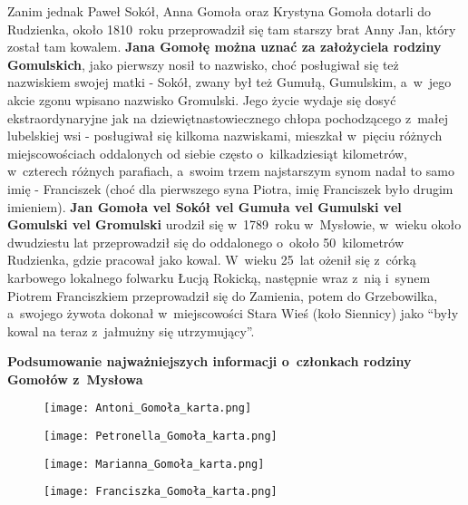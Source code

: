 Zanim jednak Paweł Sokół, Anna Gomoła oraz Krystyna Gomoła dotarli do 
Rudzienka, około 1810~roku przeprowadził się tam starszy brat Anny Jan, 
który został tam kowalem. \textbf{Jana Gomołę można uznać za założyciela 
rodziny Gomulskich}, jako pierwszy nosił to nazwisko, choć posługiwał się też 
nazwiskiem swojej matki - Sokół, zwany był też Gumułą, Gumulskim, a~w~jego 
akcie zgonu wpisano nazwisko Gromulski. Jego życie wydaje się dosyć 
ekstraordynaryjne jak na dziewiętnastowiecznego chłopa pochodzącego z~małej 
lubelskiej wsi - posługiwał się kilkoma nazwiskami, mieszkał w~pięciu
różnych miejscowościach oddalonych od siebie często o~kilkadziesiąt 
kilometrów, w~czterech różnych parafiach, a~swoim trzem najstarszym synom 
nadał to samo imię - Franciszek (choć dla pierwszego syna Piotra, imię 
Franciszek było drugim imieniem). \textbf{Jan Gomoła vel Sokół vel Gumuła vel 
Gumulski vel Gomulski vel Gromulski} urodził się w~1789~roku w~Mysłowie, 
w~wieku około dwudziestu lat przeprowadził się do oddalonego o~około 
50~kilometrów Rudzienka, gdzie pracował jako kowal. W~wieku 25~lat ożenił się 
z~córką karbowego lokalnego folwarku Łucją Rokicką, następnie wraz z~nią 
i~synem Piotrem Franciszkiem przeprowadził się do Zamienia, potem do 
Grzebowilka, a~swojego żywota dokonał w~miejscowości Stara Wieś (koło 
Siennicy) jako \enquote{były kowal na teraz z~jałmużny się utrzymujący}.

\clearpage
\textbf{\large Podsumowanie najważniejszych informacji o~członkach rodziny 
Gomołów z~Mysłowa}

\begin{figure}[!ht]
    \vspace*{0.5cm}
    \centering \texttt{[image: Antoni\_Gomoła\_karta.png]}
\end{figure}

\begin{figure}[!ht]
    \vspace*{0.5cm}
    \centering \texttt{[image: 
        Petronella\_Gomoła\_karta.png]}
\end{figure}

\begin{figure}[!ht]
    \vspace*{0.5cm}
    \centering \texttt{[image: 
        Marianna\_Gomoła\_karta.png]}
\end{figure}

\begin{figure}[!ht]
    \vspace*{0.5cm}
    \centering \texttt{[image: 
        Franciszka\_Gomoła\_karta.png]}
\end{figure}

